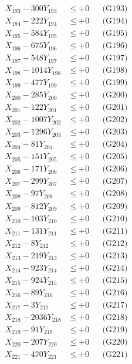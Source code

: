 \documentclass[a4paper,10pt]{article}
\begin{document}
{\begin{align}
X_{193} - 300Y_{193} &\leq +0 && \text{(G193)} \\
X_{194} - 222Y_{194} &\leq +0 && \text{(G194)} \\
X_{195} - 584Y_{195} &\leq +0 && \text{(G195)} \\
X_{196} - 675Y_{196} &\leq +0 && \text{(G196)} \\
X_{197} - 548Y_{197} &\leq +0 && \text{(G197)} \\
X_{198} - 1014Y_{198} &\leq +0 && \text{(G198)} \\
X_{199} - 477Y_{199} &\leq +0 && \text{(G199)} \\
X_{200} - 285Y_{200} &\leq +0 && \text{(G200)} \\
\allowbreak
X_{201} - 122Y_{201} &\leq +0 && \text{(G201)} \\
X_{202} - 1007Y_{202} &\leq +0 && \text{(G202)} \\
X_{203} - 1296Y_{203} &\leq +0 && \text{(G203)} \\
X_{204} - 81Y_{204} &\leq +0 && \text{(G204)} \\
X_{205} - 151Y_{205} &\leq +0 && \text{(G205)} \\
X_{206} - 171Y_{206} &\leq +0 && \text{(G206)} \\
X_{207} - 299Y_{207} &\leq +0 && \text{(G207)} \\
X_{208} - 97Y_{208} &\leq +0 && \text{(G208)} \\
X_{209} - 812Y_{209} &\leq +0 && \text{(G209)} \\
X_{210} - 103Y_{210} &\leq +0 && \text{(G210)} \\
\allowbreak
X_{211} - 131Y_{211} &\leq +0 && \text{(G211)} \\
X_{212} - 8Y_{212} &\leq +0 && \text{(G212)} \\
X_{213} - 219Y_{213} &\leq +0 && \text{(G213)} \\
X_{214} - 923Y_{214} &\leq +0 && \text{(G214)} \\
X_{215} - 924Y_{215} &\leq +0 && \text{(G215)} \\
X_{216} - 89Y_{216} &\leq +0 && \text{(G216)} \\
X_{217} - 3Y_{217} &\leq +0 && \text{(G217)} \\
X_{218} - 2036Y_{218} &\leq +0 && \text{(G218)} \\
X_{219} - 91Y_{219} &\leq +0 && \text{(G219)} \\
X_{220} - 207Y_{220} &\leq +0 && \text{(G220)} \\
\allowbreak
X_{221} - 470Y_{221} &\leq +0 && \text{(G221)} \\

\end{align}}
\end{document}
